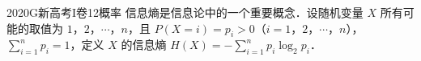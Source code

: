 
\begin{problem}{2020}{G}{新高考I卷}{12}{概率}
信息熵是信息论中的一个重要概念．设随机变量 $ X $ 所有可能的取值为 $ 1 $，$ 2 $，$ \cdots $，$ n $，且 $ P(X=i)=p_i>0 $（$ i=1 $，$ 2 $，$ \cdots $，$ n $），$ \displaystyle\sum_{i=1}^n p_i=1 $，定义 $ X $ 的信息熵 $ \displaystyle H(X)=-\sum_{i=1}^n p_i\log_2 p_i $．
\begin{choices}
\end{choices}
\end{problem}

\begin{answer}

\end{answer}

\begin{solutions}

\end{solutions}